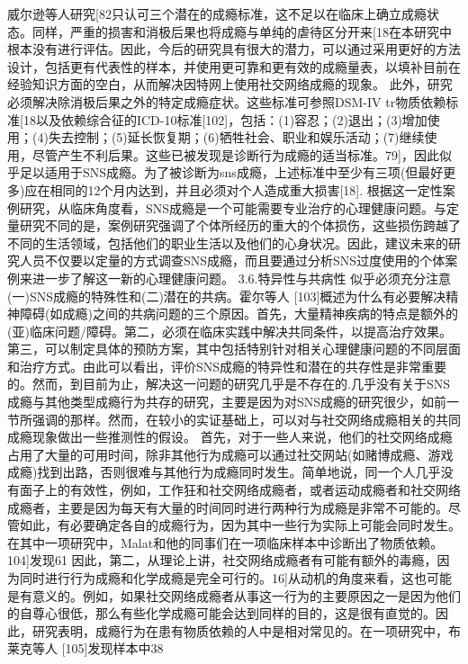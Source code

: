 威尔逊等人研究[82只认可三个潜在的成瘾标准，这不足以在临床上确立成瘾状态。同样，严重的损害和消极后果也将成瘾与单纯的虐待区分开来[18在本研究中根本没有进行评估。因此，今后的研究具有很大的潜力，可以通过采用更好的方法设计，包括更有代表性的样本，并使用更可靠和更有效的成瘾量表，以填补目前在经验知识方面的空白，从而解决因特网上使用社交网络成瘾的现象。
此外，研究必须解决除消极后果之外的特定成瘾症状。这些标准可参照DSM-IV tr物质依赖标准[18以及依赖综合征的ICD-10标准[102]，包括：(1)容忍；(2)退出；(3)增加使用；(4)失去控制；(5)延长恢复期；(6)牺牲社会、职业和娱乐活动；(7)继续使用，尽管产生不利后果。这些已被发现是诊断行为成瘾的适当标准。79]，因此似乎足以适用于SNS成瘾。为了被诊断为sns成瘾，上述标准中至少有三项(但最好更多)应在相同的12个月内达到，并且必须对个人造成重大损害[18].
根据这一定性案例研究，从临床角度看，SNS成瘾是一个可能需要专业治疗的心理健康问题。与定量研究不同的是，案例研究强调了个体所经历的重大的个体损伤，这些损伤跨越了不同的生活领域，包括他们的职业生活以及他们的心身状况。因此，建议未来的研究人员不仅要以定量的方式调查SNS成瘾，而且要通过分析SNS过度使用的个体案例来进一步了解这一新的心理健康问题。
3.6.特异性与共病性
似乎必须充分注意(一)SNS成瘾的特殊性和(二)潜在的共病。霍尔等人 [103]概述为什么有必要解决精神障碍(如成瘾)之间的共病问题的三个原因。首先，大量精神疾病的特点是额外的(亚)临床问题/障碍。第二，必须在临床实践中解决共同条件，以提高治疗效果。第三，可以制定具体的预防方案，其中包括特别针对相关心理健康问题的不同层面和治疗方式。由此可以看出，评价SNS成瘾的特异性和潜在的共存性是非常重要的。然而，到目前为止，解决这一问题的研究几乎是不存在的.几乎没有关于SNS成瘾与其他类型成瘾行为共存的研究，主要是因为对SNS成瘾的研究很少，如前一节所强调的那样。然而，在较小的实证基础上，可以对与社交网络成瘾相关的共同成瘾现象做出一些推测性的假设。
首先，对于一些人来说，他们的社交网络成瘾占用了大量的可用时间，除非其他行为成瘾可以通过社交网站(如赌博成瘾、游戏成瘾)找到出路，否则很难与其他行为成瘾同时发生。简单地说，同一个人几乎没有面子上的有效性，例如，工作狂和社交网络成瘾者，或者运动成瘾者和社交网络成瘾者，主要是因为每天有大量的时间同时进行两种行为成瘾是非常不可能的。尽管如此，有必要确定各自的成瘾行为，因为其中一些行为实际上可能会同时发生。在其中一项研究中，Malat和他的同事们在一项临床样本中诊断出了物质依赖。104]发现61%
因此，第二，从理论上讲，社交网络成瘾者有可能有额外的毒瘾，因为同时进行行为成瘾和化学成瘾是完全可行的。16]从动机的角度来看，这也可能是有意义的。例如，如果社交网络成瘾者从事这一行为的主要原因之一是因为他们的自尊心很低，那么有些化学成瘾可能会达到同样的目的，这是很有直觉的。因此，研究表明，成瘾行为在患有物质依赖的人中是相对常见的。在一项研究中，布莱克等人 [105]发现样本中38%
